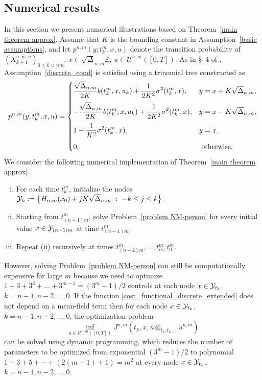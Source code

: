 \documentclass[12pt]{article}
\theoremstyle{named}
\numberwithin{equation}{section}
\let\oldcitet=\citet
\renewcommand{\cite}[1]{\textcolor[rgb]{0,0,1}{\oldcitet{#1}}}
\renewcommand{\citet}[1]{\textcolor[rgb]{0,0,1}{\oldcitet{#1}}}
\begin{document}
\subsection{Numerical results}
\label{sec:numerical}
In this section we present numerical illustrations based on
Theorem~\ref{main theorem approx}.
Assume that $K$ is the bounding constant in Assumption~\ref{basic assumptions},
and let $p^{{n},{m}}(y; t^m_k, x, u)$ denote the transition probability
of $(X^{{n},{m},u}_{k+1})_{0\leq k < nm}$,
$x \in \sqrt{\Delta}_{{n},{m}}\mathbb{Z}$,
$u \in \mathcal{U}^{{n},{m}}([0,T])$.
   As in \S~4 of \cite{fischer2007discretisation},
   Assumption~\ref{discrete_cond}
   is satisfied using a trinomial tree constructed as
\begin{equation*}
    p^{{n},{m}} (y; t^m_k, x, u )=
\begin{cases}
  \displaystyle
  \frac{\sqrt{\Delta}_{{n},{m}}}{2K} b(t^m_k, x, u_k) +\frac{1}{2K^2} \sigma^2(t^m_k, x), &
 y = x + K\sqrt{\Delta}_{{n},{m}} ,
\medskip
\\
\displaystyle
  -\frac{\sqrt{\Delta}_{{n},{m}}}{2K} b(t^m_k, x, u_k) + \frac{1}{2K^2} \sigma^2(t^m_k, x), &
 y = x - K\sqrt{\Delta}_{{n},{m}},
\medskip
\\
\displaystyle
  1 - \frac{1}{K^2} \sigma^2(t^m_k, x), &
 y = x ,
\medskip
\\
0 ,                     & \text{ otherwise.}
\end{cases}
\end{equation*}
\noindent
 We consider the following numerical implementation of Theorem~\ref{main theorem approx}.
\begin{enumerate}[(i)]
      \item For each time $t^m_k$, initialize the nodes ${\cal Y}_k := \big\{ H_{{n},{m}}(x_0) + j K \sqrt{\Delta}_{{n},{m}} \ : \ - k \leq j \leq k \big\}$.
      \item Starting from $t^m_{({n}-1){m}}$,
        solve Problem~\eqref{problem NM-person}
        for every initial value $x \in {\cal Y}_{({n}-1){m}}$
        at time $t^m_{({n}-1){m}}$.
      \item Repeat (ii) recursively at times $t^m_{({n}-2){m}}, \dots, t^m_{m}, t^m_0$.
\end{enumerate}
However, solving Problem~\eqref{problem NM-person} can still be computationally expensive for large ${m}$ because we need to optimize $1+3+3^2+\dots+3^{{m}-1} = (3^{m}-1)/2$
controls at each node $x \in {\cal Y}_{t_k }$,
 $k   = {n}-1, {n}-2, \ldots, 0$.
If the function \eqref{cost_functional_discrete_extended} does not depend on a
mean-field term then for each node $x \in {\cal Y}_{t_k }$,
$k = {n}-1, {n}-2, \ldots, 0$, the optimization problem
\begin{equation}\label{sub_problem}
    \inf\limits_{u \in \mathcal{U}^{{n},{m}}( [0,T ] )} J^{{n},{m}} (t_k,x , \bar{u} \otimes_{t_k,t_{k+1} } \bar{u}^{{n},{m}})
\end{equation}
 can be solved using dynamic programming,
which reduces the number of parameters
to be optimized
from exponential $(3^{m}-1)/2$ to polynomial $1 + 3 + 5 + \cdots + ( 2({m}-1) + 1 ) = {m}^2$ at every node $x \in {\cal Y}_{t_k }$, $k = {n}-1, {n}-2, \ldots, 0$.
\end{document}
